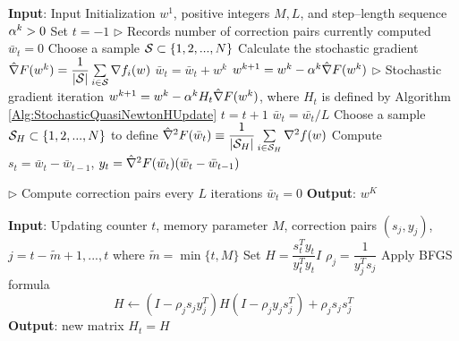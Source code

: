 \begin{algorithm}
\caption{Stochastic Quasi--Newton Method}
\label{Alg:StochasticQuasiNewton}
\begin{algorithmic}[1]
\STATE \textbf{Input}: Input Initialization $w^1$, positive integers $M, L$, and step--length sequence $\alpha^k>0$
\STATE Set $t=-1$ \hfill $\triangleright$ Records number of correction pairs currently computed
\STATE $\bar{w}_t=0$
    \STATE Choose a sample $\mathcal S\subset \{1,2,...,N\}$
    \STATE Calculate the stochastic gradient $\hat{\nabla} F(w^k)=\dfrac{1}{|\mathcal S|}\sum\limits_{i\in \mathcal S}\nabla f_i(w)$
    \STATE $\bar{w}_t=\bar{w}_t+w^k$
        \STATE $w^{k+1}=w^k-\alpha^k \hat{\nabla} F(w^k)$ \hfill $\triangleright$ Stochastic gradient iteration
    \ELSE
        \STATE $w^{k+1}=w^k-\alpha^k H_t \hat{\nabla} F(w^k)$, where $H_t$ is defined by Algorithm \ref{Alg:StochasticQuasiNewtonHUpdate}
    \ENDIF
        \STATE $t=t+1$      
        \STATE $\bar{w}_t=\bar{w_t}/L$
            \STATE Choose a sample $\mathcal S_H\subset\{1,2,...,N\}$ to define $\hat{\nabla}^2 F(\bar{w}_t)\equiv \dfrac{1}{|\mathcal S_H|}\sum\limits_{i\in \mathcal S_H}\nabla^2 f(w)$
            \STATE Compute $s_t=\bar{w}_t-\bar{w}_{t-1}$, $y_t=\hat{\nabla}^2F(\bar{w}_t)(\bar{w}_t-\bar{w}_{t-1})$
                
                 \hfill $\triangleright$ Compute correction pairs every $L$ iterations
        \ENDIF
        \STATE $\bar{w}_t=0$
    \ENDIF
\ENDFOR
\STATE \textbf{Output}: $w^K$
\end{algorithmic}
\end{algorithm}

\begin{algorithm}
\caption{Stochastic Quasi--Newton Method: Hessian Updating}
\label{Alg:StochasticQuasiNewtonHUpdate}
\begin{algorithmic}[1]
\STATE \textbf{Input}: Updating counter $t$, memory parameter $M$, correction pairs $(s_j, y_j)$, $j=t-\widetilde{m}+1, ..., t$ where $\widetilde{m}=\min\{t, M\}$
\STATE Set $H=\dfrac{s_t^Ty_t}{y_t^Ty_t}I$
    \STATE $\rho_j=\dfrac{1}{y_j^Ts_j}$
    \STATE Apply BFGS formula $$H \leftarrow (I-\rho_js_jy_j^T)H(I-\rho_jy_js_j^T)+\rho_js_js_j^T$$
\ENDFOR
\STATE \textbf{Output}: new matrix $H_t=H$
\end{algorithmic}
\end{algorithm}